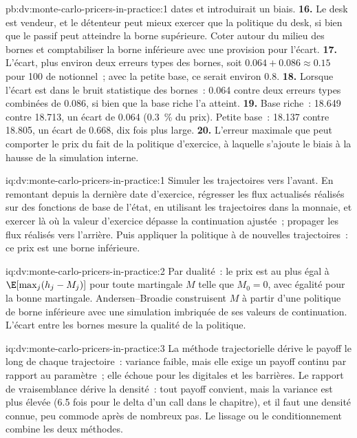 \begin{solution}{pb:dv:monte-carlo-pricers-in-practice:1}
dates et introduirait un biais.
\textbf{16.} Le desk est vendeur, et le détenteur peut mieux exercer que la politique du desk, si bien que le passif peut atteindre la borne supérieure. Coter autour du
milieu des bornes et comptabiliser la borne inférieure avec une provision pour l'écart.
\textbf{17.} L'écart, plus environ deux erreurs types des bornes, soit $0.064+0.086\approx0.15$ pour 100 de notionnel~; avec la petite base, ce serait environ 0.8.
\textbf{18.} Lorsque l'écart est dans le bruit statistique des bornes~: 0.064 contre deux erreurs types combinées de 0.086, si bien que la base riche l'a atteint.
\textbf{19.} Base riche~: 18.649 contre 18.713, un écart de 0.064 (0.3~\% du prix). Petite base~: 18.137 contre 18.805, un écart de 0.668, dix fois plus large.
\textbf{20.} L'erreur maximale que peut comporter le prix du fait de la politique d'exercice, à laquelle s'ajoute le biais à la hausse de la simulation interne.
\end{solution}

\begin{solution}{iq:dv:monte-carlo-pricers-in-practice:1}
Simuler les trajectoires vers l'avant. En remontant depuis la dernière date d'exercice, régresser les flux actualisés réalisés sur des fonctions de base de l'état, en utilisant
les trajectoires dans la monnaie, et exercer là où la valeur d'exercice dépasse la continuation ajustée~; propager les flux réalisés vers l'arrière. Puis appliquer la politique à de nouvelles
trajectoires~: ce prix est une borne inférieure.
\end{solution}

\begin{solution}{iq:dv:monte-carlo-pricers-in-practice:2}
Par dualité~: le prix est au plus égal à $\E[\max_j(h_j-M_j)]$ pour toute martingale $M$ telle que $M_0=0$, avec égalité pour la bonne martingale. Andersen--Broadie construisent $M$ à partir
d'une politique de borne inférieure avec une simulation imbriquée de ses valeurs de continuation. L'écart entre les bornes mesure la qualité de la politique.
\end{solution}

\begin{solution}{iq:dv:monte-carlo-pricers-in-practice:3}
La méthode trajectorielle dérive le payoff le long de chaque trajectoire~: variance faible, mais elle exige un payoff continu par rapport au paramètre~; elle échoue pour les digitales et les barrières.
Le rapport de vraisemblance dérive la densité~: tout payoff convient, mais la variance est plus élevée (6.5 fois pour le delta d'un call dans le chapitre), et il faut une densité connue,
peu commode après de nombreux pas. Le lissage ou le conditionnement combine les deux méthodes.
\end{solution}

